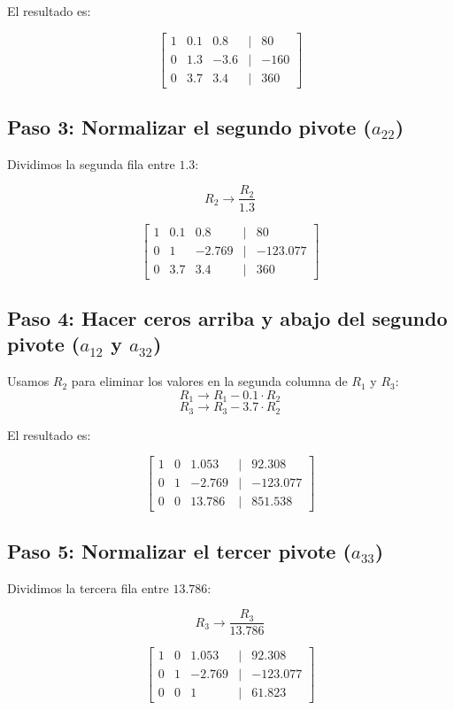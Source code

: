 \documentclass[]{article}
\begin{document}
El resultado es:

\[
\begin{bmatrix}
	1 & 0.1 & 0.8 & | & 80 \\
	0 & 1.3 & -3.6 & | & -160 \\
	0 & 3.7 & 3.4 & | & 360
\end{bmatrix}
\]

\subsection*{Paso 3: Normalizar el segundo pivote (\(a_{22}\))}

Dividimos la segunda fila entre \(1.3\):

\[
R_2 \rightarrow \frac{R_2}{1.3}
\]

\[
\begin{bmatrix}
	1 & 0.1 & 0.8 & | & 80 \\
	0 & 1 & -2.769 & | & -123.077 \\
	0 & 3.7 & 3.4 & | & 360
\end{bmatrix}
\]

\subsection*{Paso 4: Hacer ceros arriba y abajo del segundo pivote (\(a_{12}\) y \(a_{32}\))}

Usamos \(R_2\) para eliminar los valores en la segunda columna de \(R_1\) y \(R_3\):
\[
R_1 \rightarrow R_1 - 0.1 \cdot R_2
\]
\[
R_3 \rightarrow R_3 - 3.7 \cdot R_2
\]

El resultado es:

\[
\begin{bmatrix}
	1 & 0 & 1.053 & | & 92.308 \\
	0 & 1 & -2.769 & | & -123.077 \\
	0 & 0 & 13.786 & | & 851.538
\end{bmatrix}
\]

\subsection*{Paso 5: Normalizar el tercer pivote (\(a_{33}\))}

Dividimos la tercera fila entre \(13.786\):

\[
R_3 \rightarrow \frac{R_3}{13.786}
\]

\[
\begin{bmatrix}
	1 & 0 & 1.053 & | & 92.308 \\
	0 & 1 & -2.769 & | & -123.077 \\
	0 & 0 & 1 & | & 61.823
\end{bmatrix}
\]
\end{document}

